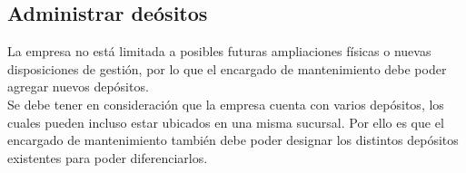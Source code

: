 \documentclass[a4paper, 12pt,twoside]{report}  %
\numberwithin{equation}{subsection} %
\begin{document}
\subsection*{Administrar deósitos}
La empresa no está limitada a posibles futuras ampliaciones físicas o nuevas disposiciones de gestión, por lo que el encargado de mantenimiento debe poder agregar nuevos depósitos.\\
\indent Se debe tener en consideración que la empresa cuenta con varios depósitos, los cuales pueden incluso estar ubicados en una misma sucursal. Por ello es que el encargado de mantenimiento también debe poder designar los distintos depósitos existentes para poder diferenciarlos.

\renewcommand{\arraystretch}{1.4}
\end{document}

